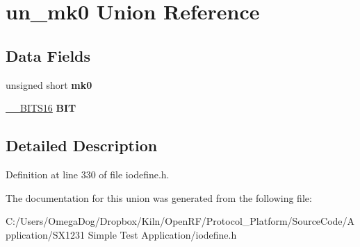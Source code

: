 \hypertarget{unionun__mk0}{\section{un\-\_\-mk0 Union Reference}
\label{unionun__mk0}
}
\subsection*{Data Fields}
\begin{DoxyCompactItemize}
\item 
\hypertarget{unionun__mk0_a9e2db1ba88ebbea925d648e62478cafc}{unsigned short {\bfseries mk0}}\label{unionun__mk0_a9e2db1ba88ebbea925d648e62478cafc}

\item 
\hypertarget{unionun__mk0_a0247813380768911013ba274e7a2364a}{\hyperlink{struct_____b_i_t_s16}{\-\_\-\-\_\-\-B\-I\-T\-S16} {\bfseries B\-I\-T}}\label{unionun__mk0_a0247813380768911013ba274e7a2364a}

\end{DoxyCompactItemize}


\subsection{Detailed Description}


Definition at line 330 of file iodefine.\-h.



The documentation for this union was generated from the following file\-:\begin{DoxyCompactItemize}
\item 
C\-:/\-Users/\-Omega\-Dog/\-Dropbox/\-Kiln/\-Open\-R\-F/\-Protocol\-\_\-\-Platform/\-Source\-Code/\-Application/\-S\-X1231 Simple Test Application/iodefine.\-h\end{DoxyCompactItemize}
